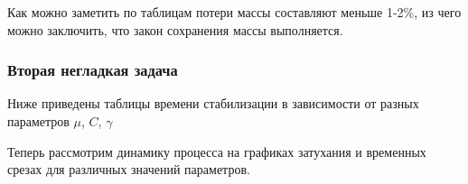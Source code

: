 Как можно заметить по таблицам потери массы составляют меньше 1-2\%, из чего можно заключить, что закон сохранения массы выполняется. \\

\newpage
\subsubsection{Вторая негладкая задача}
Ниже приведены таблицы времени стабилизации в зависимости от разных параметров $\mu$, $C$, $\gamma$





\newpage




\newpage
Теперь рассмотрим динамику процесса на графиках затухания и временных срезах для различных значений параметров. 

